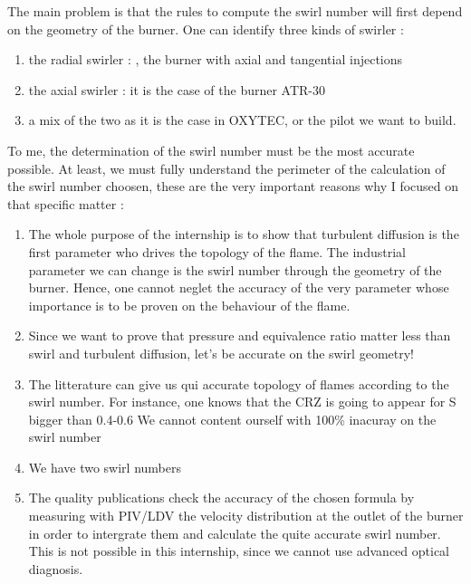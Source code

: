 The main problem is that the rules to compute the swirl number will first depend on the geometry of the burner. One can identify three kinds of swirler : 
\begin{enumerate}
\item the radial swirler : \cite{durox_flame_2013}, the burner with axial and tangential injections
\item the axial swirler : it is the case of the burner ATR-30
\item a mix of the two \cite{paul_jourdaine_nom_effect_2016} as it is the case in OXYTEC, or the pilot we want to build.
\end{enumerate}

To me, the determination of the swirl number must be the most accurate possible. At least, we must fully understand the perimeter of the calculation of the swirl number choosen, these are the very important reasons why I focused on that specific matter :
\begin{enumerate}
\item The whole purpose of the internship is to show that turbulent diffusion is the first parameter who drives the topology of the flame. The industrial parameter we can change is the swirl number through the geometry of the burner. Hence, one cannot neglet the accuracy of the very parameter whose importance is to be proven on the behaviour of the flame.
\item Since we want to prove that pressure and equivalence ratio matter less than swirl and turbulent diffusion, let's be accurate on the swirl geometry!
\item The litterature can give us qui accurate topology of flames according to the swirl number. For instance, one knows that the CRZ is going to appear for S bigger than 0.4-0.6 We cannot content ourself with 100\% inacuray on the swirl number
\item We have two swirl numbers
\item The quality publications check the accuracy of the chosen formula by measuring with PIV/LDV the velocity distribution at the outlet of the burner in order to intergrate them and calculate the quite accurate swirl number. This is not possible in this internship, since we cannot use advanced optical diagnosis.
\end{enumerate}



 




